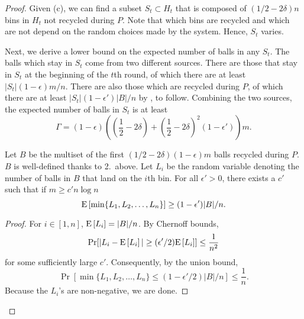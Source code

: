 \begin{proof}
	Given (c), we can find a subset $S_t \subset H_t$ that is composed of
	$(1/2-2\delta)n$ bins in $H_t$ not recycled during $P$.  Note that which
	bins are recycled and which are not depend on the random choices made by the
	system. Hence, $S_t$ varies.  
		
	Next, we derive a lower bound on the expected number of balls in any $S_t$.
	The balls which stay in $S_t$ come from two different sources. There are
	those that stay in $S_t$ at the beginning of the $t$th round, of which
	there are at least $|S_t|(1-\epsilon)m/n$.  There are also those which are
	recycled during $P$, of which there are at least
	$|S_t|(1-\epsilon')|B|/n$ by , to follow.  Combining the
	two sources, the expected number of balls in $S_t$ is at least
	\begin{equation*}
		\Gamma = (1-\epsilon)\left( \left(\frac{1}{2}-2\delta\right) +
		\left(\frac{1}{2}-2\delta\right)^2(1-\epsilon')\right)m.
	\end{equation*}

	\begin{lemma}\label{lem:MinBin}
	Let $B$ be the multiset of the first $(1/2-2\delta)(1-\epsilon)m$ balls
	recycled during $P$. $B$ is well-defined thanks to 2.\ above. Let $L_i$ be
	the random variable denoting the number of balls in $B$ that land on the
	$i$th bin. For all $\epsilon' > 0$, there exists a $c'$ such
        that if $m \ge c' n \log n$
		\begin{equation*}
			\mathrm{E}\left[\min\{L_1, L_2, \ldots, L_n\}\right] \ge (1-\epsilon')|B|/n.
		\end{equation*}
	\end{lemma}
	\begin{proof}
		For $i \in [1,n]$, $\mathrm{E}\left[L_i\right] = |B|/n$.
		By Chernoff bounds, 
		$$
			\Pr[|L_i-\mathrm{E}\left[L_i\right]| \ge (\epsilon'/2) \mathrm{E}\left[L_i\right]] \le \frac{1}{n^2} 
		$$
		for some sufficiently large $c'$. Consequently, by the union bound,
		$$
			\Pr[\min\{L_1, L_2, \ldots, L_n\} \le (1-\epsilon'/2)|B|/n] \le \frac{1}{n}.
		$$
		Because the $L_i$'s are non-negative, we are done. 
	\end{proof}


\end{proof}
